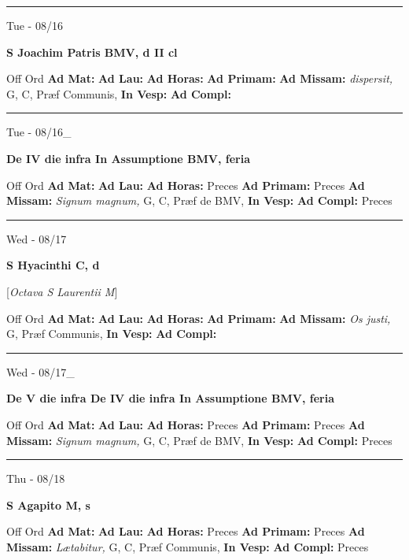 \documentclass[letterpaper, 10pt]{article}
\begin{document}
\hrule
\begin{center}
Tue - 08/16
\end{center}\textbf{ \large S Joachim Patris BMV, \textnormal{\normalsize d II cl}}
\begin{justify}
Off Ord
\textbf{Ad Mat: }
\textbf{Ad Lau: }
\textbf{Ad Horas: }
\textbf{Ad Primam: }
\textbf{Ad Missam:} \textit{dispersit, } G, C, Præf Communis, 
\textbf{In Vesp: }
\textbf{Ad Compl: }\end{justify}



\hrule
\begin{center}
Tue - 08/16\_
\end{center}\textbf{ \large De IV die infra In Assumptione BMV, \textnormal{\normalsize feria}}
\begin{justify}
Off Ord
\textbf{Ad Mat: }
\textbf{Ad Lau: }
\textbf{Ad Horas: }Preces
\textbf{Ad Primam: }Preces
\textbf{Ad Missam:} \textit{Signum magnum, } G, C, Præf de BMV, 
\textbf{In Vesp: }
\textbf{Ad Compl: }Preces\end{justify}



\hrule
\begin{center}
Wed - 08/17
\end{center}\textbf{ \large S Hyacinthi C, \textnormal{\normalsize d}}

[\textit{Octava S Laurentii M}]
\begin{justify}
Off Ord
\textbf{Ad Mat: }
\textbf{Ad Lau: }
\textbf{Ad Horas: }
\textbf{Ad Primam: }
\textbf{Ad Missam:} \textit{Os justi, } G, Præf Communis, 
\textbf{In Vesp: }
\textbf{Ad Compl: }\end{justify}



\hrule
\begin{center}
Wed - 08/17\_
\end{center}\textbf{ \large De V die infra De IV die infra In Assumptione BMV, \textnormal{\normalsize feria}}
\begin{justify}
Off Ord
\textbf{Ad Mat: }
\textbf{Ad Lau: }
\textbf{Ad Horas: }Preces
\textbf{Ad Primam: }Preces
\textbf{Ad Missam:} \textit{Signum magnum, } G, C, Præf de BMV, 
\textbf{In Vesp: }
\textbf{Ad Compl: }Preces\end{justify}



\hrule
\begin{center}
Thu - 08/18
\end{center}\textbf{ \large S Agapito M, \textnormal{\normalsize s}}
\begin{justify}
Off Ord
\textbf{Ad Mat: }
\textbf{Ad Lau: }
\textbf{Ad Horas: }Preces
\textbf{Ad Primam: }Preces
\textbf{Ad Missam:} \textit{Lætabitur, } G, C, Præf Communis, 
\textbf{In Vesp: }
\textbf{Ad Compl: }Preces\end{justify}
\end{document}
